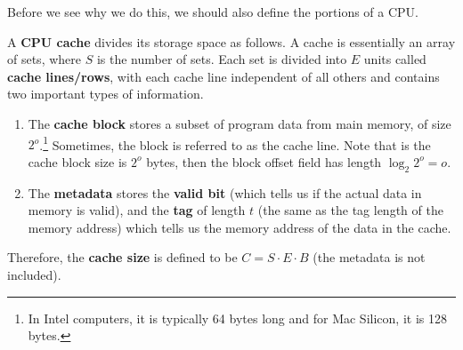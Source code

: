   Before we see why we do this, we should also define the portions of a CPU. 

  \begin{definition}
    \label{def:cpu-cache}
    A \textbf{CPU cache} divides its storage space as follows. A cache is essentially an array of sets, where $S$ is the number of sets. Each set is divided into $E$ units called \textbf{cache lines/rows}, with each cache line independent of all others and contains two important types of information. 
    \begin{enumerate}
      \item The \textbf{cache block} stores a subset of program data from main memory, of size $2^o$.\footnote{In Intel computers, it is typically 64 bytes long and for Mac Silicon, it is 128 bytes.} Sometimes, the block is referred to as the cache line. Note that is the cache block size is $2^o$ bytes, then the block offset field has length $\log_2 2^o = o$.
      \item The \textbf{metadata} stores the \textbf{valid bit} (which tells us if the actual data in memory is valid), and the \textbf{tag} of length $t$ (the same as the tag length of the memory address) which tells us the memory address of the data in the cache. 
    \end{enumerate}
    Therefore, the \textbf{cache size} is defined to be $C = S \cdot E \cdot B$ (the metadata is not included). 
    \begin{figure}[H]
      \centering 
\end{figure}
\end{definition}
